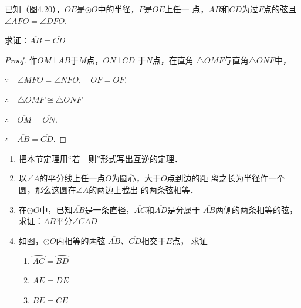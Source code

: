 \begin{example}
    已知（图4.20），$\overline{OE}$是$\odot O$中的半径，$F$是$\overline{OE}$上任一
点，$\overline{AB}$和$\overline{CD}$为过$F$点的弦且$\angle AFO=\angle DFO$.

求证：$\overline{AB}=\overline{CD}$
\end{example}

\begin{figure}[htp]
    \centering
{}
    \caption{}
\end{figure}


\begin{proof}
作$\overline{OM}\bot \overline{AB}$于$M$点，$\overline{ON}\bot \overline{CD}$ 于$N$点，在直角
$\triangle OMF$与直角$\triangle ONF$中，

$\because\quad \angle MFO=\angle NFO,\quad \overline{OF}=\overline{OF}$.

$\therefore\quad \triangle OMF\cong \triangle ONF$

$\therefore\quad \overline{OM}=\overline{ON}$.

$\therefore\quad \overline{AB}=\overline{CD}$.
\end{proof}

\begin{ex}
\begin{enumerate}
    \item 把本节定理用“若—则”形式写出互逆的定理．
    \item 以$\angle A$的平分线上任一点$O$为圆心，大于$O$点到边的距
    离之长为半径作一个圆，那么这圆在$\angle A$的两边上截出
    的两条弦相等．
    \item 在$\odot O$中，已知$\overline{AB}$是一条直径，$\overline{AC}$和$\overline{AD}$是分属于
    $\overline{AB}$两侧的两条相等的弦，
    求证：$AB$平分$\angle CAD$
    \item 如图，$\odot O$内相等的两弦
    $\overline{AB}$、$\overline{CD}$相交于$E$点，
    求证
    \begin{enumerate}
        \item $\wideparen{AC}=\wideparen{BD}$
        \item $\overline{AE}=\overline{DE}$
        \item $\overline{BE}=\overline{CE}$
    \end{enumerate}
\end{enumerate}
\end{ex}

